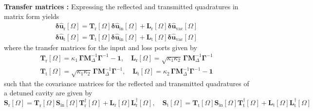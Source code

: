 \noindent \textbf{Transfer matrices :} Expressing the reflected and transmitted quadratures in matrix form yields
\begin{equation}
  \begin{split}
   \mathbf{\delta \hat{u}_{\mathrm{r}}}[\Omega] = \mathbf{T}_{\mathrm{r}}[\Omega]  \mathbf{\delta \hat{u}_{\mathrm{in}}}[\Omega] + \mathbf{L}_{\mathrm{r}}[\Omega]  \mathbf{\delta \hat{u}_{\mathrm{vac}}}[\Omega]
    \\
    \mathbf{\delta \hat{u}_{\mathrm{t}}}[\Omega] = \mathbf{T}_{\mathrm{t}}[\Omega]  \mathbf{\delta \hat{u}_{\mathrm{in}}}[\Omega] + \mathbf{L}_{\mathrm{t}}[\Omega]  \mathbf{\delta \hat{u}_{\mathrm{vac}}}[\Omega]
  \end{split}
\end{equation}
where the transfer matrices for the input and loss ports given by
\begin{equation}
  \begin{split}
     \mathbf{T}_{\mathrm{r}}[\Omega]= \kappa_1 \, \mathbf{\Gamma} \mathbf{M}^{-1}_\Delta \mathbf{\Gamma}^{-1}- \mathbf{1}, \quad \mathbf{L}_{\mathrm{r}}[\Omega]=  \sqrt{\kappa_1 \kappa_2} \, \mathbf{\Gamma}  \mathbf{M}^{-1}_\Delta \mathbf{\Gamma}^{-1}\\
      \mathbf{T}_{\mathrm{t}}[\Omega]=   \sqrt{\kappa_1 \kappa_2} \, \mathbf{\Gamma}  \mathbf{M}^{-1}_\Delta \mathbf{\Gamma}^{-1}, \quad \mathbf{L}_{\mathrm{t}}[\Omega]= \kappa_2 \, \mathbf{\Gamma} \mathbf{M}^{-1}_\Delta \mathbf{\Gamma}^{-1}- \mathbf{1}
  \end{split}
\end{equation}
such that the covariance matrices for the reflected and transmitted quadratures of a detuned cavity are given by
\begin{equation}
  \mathbf{S}_{\mathrm{r}}[\Omega] = \mathbf{T}_{\mathrm{r}}[\Omega] \mathbf{S}_{\mathrm{in}}[\Omega] \mathbf{T}_{\mathrm{r}}^{\dagger}[\Omega] + \mathbf{L}_{\mathrm{r}}[\Omega] \mathbf{L}_{\mathrm{r}}^{\dagger}[\Omega], \quad  \mathbf{S}_{\mathrm{t}}[\Omega] = \mathbf{T}_{\mathrm{t}}[\Omega] \mathbf{S}_{\mathrm{in}}[\Omega] \mathbf{T}_{\mathrm{t}}^{\dagger}[\Omega] + \mathbf{L}_{\mathrm{t}}[\Omega] \mathbf{L}_{\mathrm{t}}^{\dagger}[\Omega]
\end{equation}








